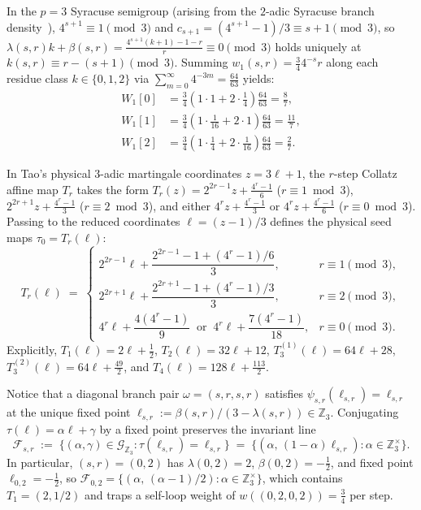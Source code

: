 \documentclass[11pt,a4paper]{article}
\numberwithin{equation}{section}
\theoremstyle{definition}
\theoremstyle{remark}
\newcommand{\Z}{\mathbb{Z}}
\newcommand{\cG}{\mathcal{G}}
\newcommand{\cF}{\mathcal{F}}
\begin{document}
In the $p=3$ Syracuse semigroup (arising from the $2$-adic Syracuse branch density~\cite{Terras1976,Tao2019}), $4^{s+1} \equiv 1 \pmod 3$ and $c_{s+1} = (4^{s+1}-1)/3 \equiv s+1 \pmod 3$, so $\lambda(s,r)k + \beta(s,r) = \frac{4^{s+1}(k+1)-1-r}{r} \equiv 0 \pmod 3$ holds uniquely at $k(s,r) \equiv r - (s+1) \pmod 3$. Summing $w_1(s,r) = \frac{3}{4}4^{-s} r$ along each residue class $k \in \{0, 1, 2\}$ via $\sum_{m=0}^\infty 4^{-3m} = \frac{64}{63}$ yields:
\begin{equation}\label{eq:W1_syracuse_exact}
\begin{aligned}
W_1[0] &= \frac{3}{4}\left(1\cdot 1 + 2\cdot\frac{1}{4}\right)\frac{64}{63} = \frac{8}{7},\\
W_1[1] &= \frac{3}{4}\left(1\cdot\frac{1}{16} + 2\cdot 1\right)\frac{64}{63} = \frac{11}{7},\\
W_1[2] &= \frac{3}{4}\left(1\cdot\frac{1}{4} + 2\cdot\frac{1}{16}\right)\frac{64}{63} = \frac{2}{7}.
\end{aligned}
\end{equation}

In Tao's physical $3$-adic martingale coordinates $z = 3\ell + 1$, the $r$-step Collatz affine map $T_r$ takes the form $T_r(z) = 2^{2r-1}z + \frac{4^r-1}{6}$ ($r \equiv 1 \bmod 3$), $2^{2r+1}z + \frac{4^r-1}{3}$ ($r \equiv 2 \bmod 3$), and either $4^r z + \frac{4^r-1}{3}$ or $4^r z + \frac{4^r-1}{6}$ ($r \equiv 0 \bmod 3$). Passing to the reduced coordinates $\ell = (z-1)/3$ defines the physical seed maps $\tau_0 = T_r(\ell)$:
\[
T_r(\ell) \;=\;
\begin{cases}
2^{2r-1}\ell + \dfrac{2^{2r-1}-1 + (4^r-1)/6}{3}, & r \equiv 1 \pmod 3, \\[6pt]
2^{2r+1}\ell + \dfrac{2^{2r+1}-1 + (4^r-1)/3}{3}, & r \equiv 2 \pmod 3, \\[6pt]
4^r\ell + \dfrac{4(4^r-1)}{9} \;\;\text{or}\;\; 4^r\ell + \dfrac{7(4^r-1)}{18}, & r \equiv 0 \pmod 3.
\end{cases}
\]
Explicitly, $T_1(\ell) = 2\ell + \frac{1}{2}$, $T_2(\ell) = 32\ell + 12$, $T_3^{(1)}(\ell) = 64\ell + 28$, $T_3^{(2)}(\ell) = 64\ell + \frac{49}{2}$, and $T_4(\ell) = 128\ell + \frac{113}{2}$.

Notice that a diagonal branch pair $\omega = (s, r, s, r)$ satisfies $\psi_{s,r}(\ell_{s,r}) = \ell_{s,r}$ at the unique fixed point $\ell_{s,r} := \beta(s,r)/(3 - \lambda(s,r)) \in \Z_3$. Conjugating $\tau(\ell) = \alpha\ell + \gamma$ by a fixed point preserves the invariant line
\[
\cF_{s, r} \;:=\; \bigl\{(\alpha, \gamma) \in \cG_{\Z_3} : \tau(\ell_{s,r}) = \ell_{s,r}\bigr\} \;=\; \bigl\{(\alpha,\, (1 - \alpha)\ell_{s,r}) : \alpha \in \Z_3^\times\bigr\}.
\]
In particular, $(s, r) = (0, 2)$ has $\lambda(0,2) = 2$, $\beta(0,2) = -\frac{1}{2}$, and fixed point $\ell_{0,2} = -\frac{1}{2}$, so $\cF_{0,2} = \{(\alpha,\, (\alpha - 1)/2) : \alpha \in \Z_3^\times\}$, which contains $T_1 = (2, 1/2)$ and traps a self-loop weight of $w((0,2,0,2)) = \frac{3}{4}$ per step.
\end{document}
